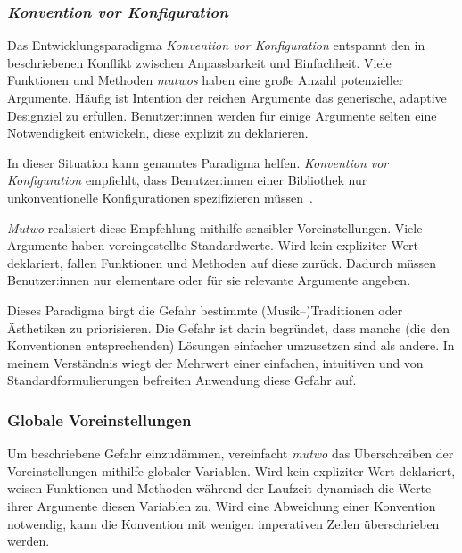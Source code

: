 \documentclass[12pt,a4paper,ngerman]{article}
\begin{document}
\subsubsection{\emph{Konvention vor Konfiguration}}
\label{conventionOverConfiguration}

Das Entwicklungsparadigma \emph{Konvention vor Konfiguration} entspannt den in \emph{} beschriebenen Konflikt zwischen Anpassbarkeit und Einfachheit.
Viele Funktionen und Methoden \emph{mutwos} haben eine große Anzahl potenzieller Argumente.
Häufig ist Intention der reichen Argumente das generische, adaptive Designziel zu erfüllen.
Benutzer:innen werden für einige Argumente selten eine Notwendigkeit entwickeln, diese explizit zu deklarieren.

\bigskip

In dieser Situation kann genanntes Paradigma helfen.
\emph{Konvention vor Konfiguration} empfiehlt, dass Benutzer:innen einer Bibliothek nur unkonventionelle Konfigurationen spezifizieren müssen~\parencite{conventionOverConfiguration}.

\bigskip

\emph{Mutwo} realisiert diese Empfehlung mithilfe sensibler Voreinstellungen.
Viele Argumente haben voreingestellte Standardwerte.
Wird kein expliziter Wert deklariert, fallen Funktionen und Methoden auf diese zurück.
Dadurch müssen Benutzer:innen nur elementare oder für sie relevante Argumente angeben.

\bigskip

Dieses Paradigma birgt die Gefahr bestimmte (Musik--)Traditionen oder Ästhetiken zu priorisieren.
Die Gefahr ist darin begründet, dass manche (die den Konventionen entsprechenden) Lösungen einfacher umzusetzen sind als andere.
In meinem Verständnis wiegt der Mehrwert einer einfachen, intuitiven und von Standardformulierungen befreiten Anwendung diese Gefahr auf.

\subsubsection{Globale Voreinstellungen}

Um beschriebene Gefahr einzudämmen, vereinfacht \emph{mutwo} das Überschreiben der Voreinstellungen mithilfe globaler Variablen.
Wird kein expliziter Wert deklariert, weisen Funktionen und Methoden während der Laufzeit dynamisch die Werte ihrer Argumente diesen Variablen zu.
Wird eine Abweichung einer Konvention notwendig, kann die Konvention mit wenigen imperativen Zeilen überschrieben werden.
\end{document}
